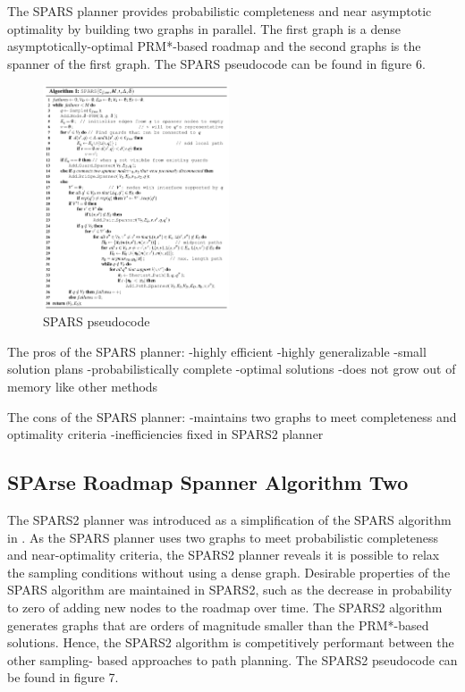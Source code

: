 \documentclass[conference]{IEEEtran} \usepackage[T1]{fontenc} \usepackage[backend=biber, style=ieee]{biblatex}
\begin{document}
The SPARS planner provides probabilistic completeness and near asymptotic optimality by building two graphs in parallel. The first graph is a dense asymptotically-optimal
PRM*-based roadmap and the second graphs is the spanner of the first graph. The SPARS pseudocode can be found in figure 6.

\begin{figure}
\label{figure6} 
\centering 
\includegraphics[width=0.49\textwidth]{spars}
\caption{SPARS pseudocode}
\end{figure}

The pros of the SPARS planner:
-highly efficient
-highly generalizable
-small solution plans
-probabilistically complete
-optimal solutions
-does not grow out of memory like other methods

The cons of the SPARS planner:
-maintains two graphs to meet completeness and optimality criteria
-inefficiencies fixed in SPARS2 planner

\subsection{SPArse Roadmap Spanner Algorithm Two} \label{SPARS2}
The SPARS2 planner was introduced as a simplification of the SPARS algorithm in \cite{spars_two}. As the SPARS planner uses two graphs to meet probabilistic 
completeness and near-optimality criteria, the SPARS2 planner reveals it is possible to relax the sampling conditions without using a dense graph. Desirable properties
of the SPARS algorithm are maintained in SPARS2, such as the decrease in probability to zero of adding new nodes to the roadmap over time. The SPARS2 algorithm
generates graphs that are orders of magnitude smaller than the PRM*-based solutions. Hence, the SPARS2 algorithm is competitively performant between the other sampling-
based approaches to path planning. The SPARS2 pseudocode can be found in figure 7.
\end{document}
